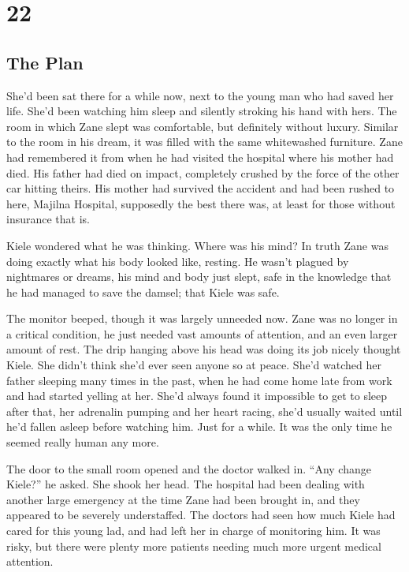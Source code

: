 \chapter{22}
\section{The Plan}


She'd been sat there for a while now, next to the young man who had saved her life.  She'd been watching him sleep and silently stroking his hand with hers.  The room in which Zane slept was comfortable, but definitely without luxury.  Similar to the room in his dream, it was filled with the same whitewashed furniture.  Zane had remembered it from when he had visited the hospital where his mother had died.  His father had died on impact, completely crushed by the force of the other car hitting theirs.  His mother had survived the accident and had been rushed to here, Majilna Hospital, supposedly the best there was, at least for those without insurance that is.  

  Kiele wondered what he was thinking.  Where was his mind?  In truth Zane was doing exactly what his body looked like, resting.  He wasn't plagued by nightmares or dreams, his mind and body just slept, safe in the knowledge that he had managed to save the damsel; that Kiele was safe.  

The monitor beeped, though it was largely unneeded now.  Zane was no longer in a critical condition, he just needed vast amounts of attention, and an even larger amount of rest.  The drip hanging above his head was doing its job nicely thought Kiele.  She didn't think she'd ever seen anyone so at peace.  She'd watched her father sleeping many times in the past, when he had come home late from work and had started yelling at her.  She'd always found it impossible to get to sleep after that, her adrenalin pumping and her heart racing, she'd usually waited until he'd fallen asleep before watching him.  Just for a while.  It was the only time he seemed really human any more.

The door to the small room opened and the doctor walked in.  ``Any change Kiele?'' he asked.  She shook her head.  The hospital had been dealing with another large emergency at the time Zane had been brought in, and they appeared to be severely understaffed.  The doctors had seen how much Kiele had cared for this young lad, and had left her in charge of monitoring him.  It was risky, but there were plenty more patients needing much more urgent medical attention.  

